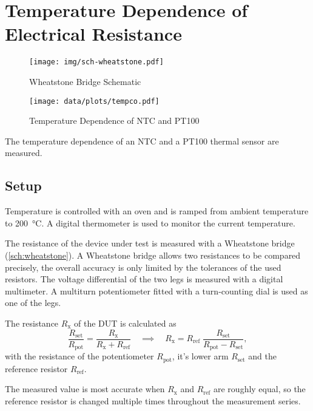 \chapter{Temperature Dependence of Electrical Resistance}

\begin{figure}[tbp]
	\centering
	\texttt{[image: img/sch-wheatstone.pdf]}
	\caption{Wheatstone Bridge Schematic}
	\label{sch:wheatstone}
\end{figure}

\begin{figure}[tbp]
	\centering
	\texttt{[image: data/plots/tempco.pdf]}
	\caption{Temperature Dependence of NTC and PT100}
	\label{plot:tempco}
\end{figure}

The temperature dependence of an NTC and a PT100 thermal sensor are measured.

\section{Setup}

Temperature is controlled with an oven and is ramped from ambient temperature to \SI{200}{\celsius}.
A digital thermometer is used to monitor the current temperature.

The resistance of the device under test is measured with a Wheatstone bridge (\autoref{sch:wheatstone}).
A Wheatstone bridge allows two resistances to be compared precisely, the overall accuracy is only limited by the tolerances of the used resistors.
The voltage differential of the two legs is measured with a digital multimeter.
A multiturn potentiometer fitted with a turn-counting dial is used as one of the legs.

The resistance $R_\text{x}$ of the DUT is calculated as
\begin{equation}
	\frac{R_\text{set}}{R_\text{pot}} = \frac{R_\text{x}}{R_\text{x} + R_\text{ref}}
	\quad \implies \quad R_\text{x} = R_\text{ref} \; \frac{R_\text{set}}{R_\text{pot} - R_\text{set}},
\end{equation}
with the resistance of the potentiometer $R_\text{pot}$, it's lower arm $R_\text{set}$ and the reference resistor $R_\text{ref}$.

The measured value is most accurate when $R_\text{x}$ and $R_\text{ref}$ are roughly equal, so the reference resistor is changed multiple times throughout the measurement series.

